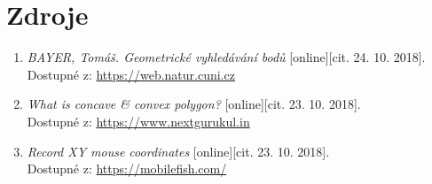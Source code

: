 \documentclass[a4paper, 12pt]{article}
\begin{document}
\section{Zdroje}
\begin{enumerate}
\item  \textsl{BAYER, Tomáš. Geometrické vyhledávání bodů} [online][cit. 24. 10. 2018]. \\
Dostupné z: \href{https://web.natur.cuni.cz/~bayertom/images/courses/Adk/adk3.pdf}{https://web.natur.cuni.cz}
\item  \textsl{What is concave \& convex polygon?} [online][cit. 23. 10. 2018]. \\
Dostupné z: \href{https://www.nextgurukul.in/nganswers/ask-question/answer/What-is-concave-38-convex-polygon-/Understanding-Quadrilaterals/75323.htm}{https://www.nextgurukul.in}
\item \textsl{Record XY mouse coordinates} [online][cit. 23. 10. 2018].\\
Dostupné z: \href{https://mobilefish.com/services/record_mouse_coordinates/record_mouse_coordinates.php}{https://mobilefish.com/}\\

\end{enumerate}
\end{document}
